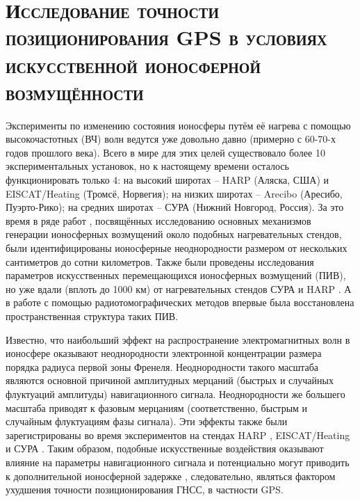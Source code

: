 \chapter{\textsc{Исследование точности позиционирования GPS в условиях искусственной ионосферной возмущённости}}

Эксперименты по изменению состояния ионосферы путём её нагрева с помощью высокочастотных (ВЧ) волн ведутся уже довольно давно (примерно с 60-70-х годов прошлого века). 
Всего в мире для этих целей существовало более 10 экспериментальных установок, но к настоящему времени осталось функционировать только 4: на высокий широтах -- HARP (Аляска, США) и EISCAT/Heating (Тромсё, Норвегия); на низких широтах -- Arecibo (Аресибо, Пуэрто-Рико); на средних широтах -- СУРА (Нижний Новгород, Россия).
За это время в ряде работ \cite{Gurevich2007, Streltsov2018, Stubbe1996, Erukhimov1987, Leyser2001, Stubbe1997, Grach2016}, посвящённых исследованию основных механизмов генерации ионосферных возмущений около подобных нагревательных стендов, были идентифицированы ионосферные неоднородности размером от нескольких сантиметров до сотни километров.
Также были проведены исследования параметров искусственных перемещающихся ионосферных возмущений (ПИВ), но уже вдали (вплоть до 1000 км) от нагревательных стендов СУРА \cite{Chernogor2011, Chernogor2013} и HARP \cite{Mishin2012, Pradipta2015}.
А в работе \cite{Kunitsyn2012} с помощью радиотомографических методов впервые была восстановлена пространственная структура таких ПИВ.

Известно, что наибольший эффект на распространение электромагнитных волн в ионосфере оказывают неоднородности электронной концентрации размера порядка радиуса первой зоны Френеля.
Неоднородности такого масштаба являются основной причиной амплитудных мерцаний (быстрых и случайных флуктуаций амплитуды) навигационного сигнала.
Неоднородности же большего масштаба приводят к фазовым мерцаниям (соответственно, быстрым и случайным флуктуациям фазы сигнала).
Эти эффекты также были зарегистрированы во время экспериментов на стендах HARP \cite{Bernhardt2016}, EISCAT/Heating \cite{Tereshchenko2000} и СУРА \cite{Tereshchenko2004}. 
Таким образом, подобные искусственные воздействия оказывают влияние на параметры навигационного сигнала и потенциально могут приводить к дополнительной ионосферной задержке \cite{Jakowski1997}, следовательно, являться фактором ухудшения точности позиционирования ГНСС, в частности GPS.

